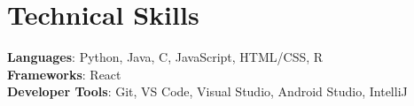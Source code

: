 \documentclass[letterpaper,11pt]{article}
\begin{document}
\section{Technical Skills}
 \begin{itemize}[leftmargin=0.15in, label={}]
    \small{\item{
		\textbf{Languages}{: Python, Java, C, JavaScript, HTML/CSS, R} \\
		\textbf{Frameworks}{: React} \\
		\textbf{Developer Tools}{: Git, VS Code, Visual Studio, Android Studio, IntelliJ} \\
    }}
 \end{itemize}
\end{document}
